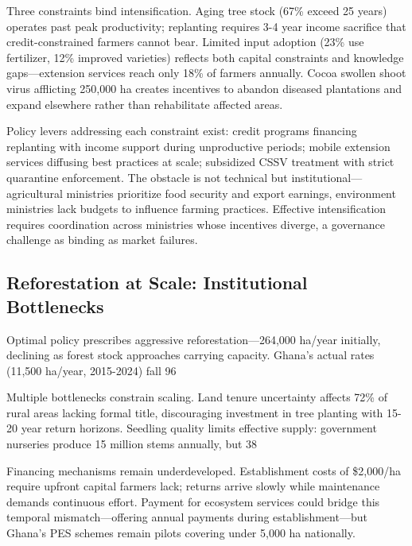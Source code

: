 Three constraints bind intensification. Aging tree stock (67\% exceed 25 years) operates past peak productivity; replanting requires 3-4 year income sacrifice that credit-constrained farmers cannot bear. Limited input adoption (23\% use fertilizer, 12\% improved varieties) reflects both capital constraints and knowledge gaps—extension services reach only 18\% of farmers annually. Cocoa swollen shoot virus afflicting 250,000 ha creates incentives to abandon diseased plantations and expand elsewhere rather than rehabilitate affected areas.

Policy levers addressing each constraint exist: credit programs financing replanting with income support during unproductive periods; mobile extension services diffusing best practices at scale; subsidized CSSV treatment with strict quarantine enforcement. The obstacle is not technical but institutional—agricultural ministries prioritize food security and export earnings, environment ministries lack budgets to influence farming practices. Effective intensification requires coordination across ministries whose incentives diverge, a governance challenge as binding as market failures.

\subsection{Reforestation at Scale: Institutional Bottlenecks}

Optimal policy prescribes aggressive reforestation—264,000 ha/year initially, declining as forest stock approaches carrying capacity. Ghana's actual rates (11,500 ha/year, 2015-2024) fall 96%

Multiple bottlenecks constrain scaling. Land tenure uncertainty affects 72\% of rural areas lacking formal title, discouraging investment in tree planting with 15-20 year return horizons. Seedling quality limits effective supply: government nurseries produce 15 million stems annually, but 38%

Financing mechanisms remain underdeveloped. Establishment costs of \$2,000/ha require upfront capital farmers lack; returns arrive slowly while maintenance demands continuous effort. Payment for ecosystem services could bridge this temporal mismatch—offering annual payments during establishment—but Ghana's PES schemes remain pilots covering under 5,000 ha nationally.

